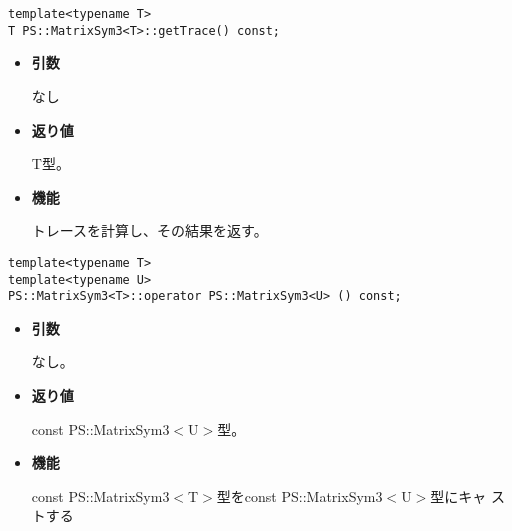 
\begin{screen}
\begin{verbatim}
template<typename T>
T PS::MatrixSym3<T>::getTrace() const;
\end{verbatim}
\end{screen}

\begin{itemize}

\item{{\bf 引数}}

なし

\item{{\bf 返り値}}

{T}型。

\item{{\bf 機能}}

  トレースを計算し、その結果を返す。

\end{itemize}


\begin{screen}
\begin{verbatim}
template<typename T>
template<typename U>
PS::MatrixSym3<T>::operator PS::MatrixSym3<U> () const;
\end{verbatim}
\end{screen}

\begin{itemize}

\item{{\bf 引数}}

  なし。

\item{{\bf 返り値}}

{const PS::MatrixSym3$<$U$>$}型。

\item{{\bf 機能}}

  {const PS::MatrixSym3$<$T$>$}型を{const PS::MatrixSym3$<$U$>$}型にキャ
  ストする

\end{itemize}

